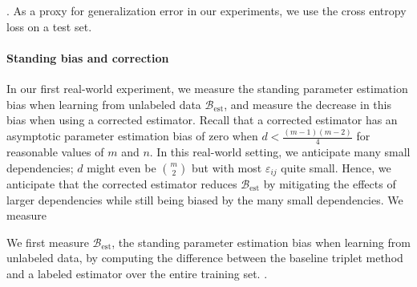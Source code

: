 . As a proxy for generalization error in our experiments, we use the cross entropy loss on a test set.

\paragraph{Standing bias and correction}

In our first real-world experiment, we measure the standing parameter estimation bias when learning from unlabeled data $\mathcal{B}_\text{est}$, and measure the decrease in this bias when using a corrected estimator. Recall that a corrected estimator has an asymptotic parameter estimation bias of zero when $d<\frac{(m-1)(m-2)}{4}$ for reasonable values of $m$ and $n$. In this real-world setting, we anticipate many small dependencies; $d$ might even be $m \choose 2$ but with most $\varepsilon_{ij}$ quite small. Hence, we anticipate that the corrected estimator reduces $\mathcal{B}_\text{est}$ by mitigating the effects of larger dependencies while still being biased by the many small dependencies. We measure 

We first measure $\mathcal{B}_\text{est}$, the standing parameter estimation bias when learning from unlabeled data, by computing the difference between the baseline triplet method and a labeled estimator over the entire training set. .


